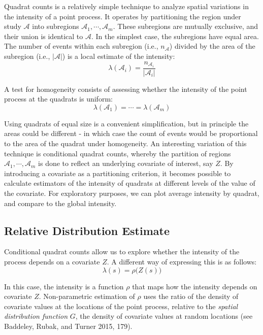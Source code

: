 \documentclass[smallextended]{svjour3}       %
\begin{document}
Quadrat counts is a relatively simple technique to analyze spatial
variations in the intensity of a point process. It operates by
partitioning the region under study \(\mathcal{A}\) into subregions
\(\mathcal{A}_1,\cdots,\mathcal{A}_m\). These subregions are mutually
exclusive, and their union is identical to \(\mathcal{A}\). In the
simplest case, the subregions have equal area. The number of events
within each subregion (i.e., \(n_{\mathcal{A}}\)) divided by the area of
the subregion (i.e., \(|\mathcal{A}|\)) is a local estimate of the
intensity: \[
\lambda(\mathcal{A}_i)=\frac{n_{\mathcal{A}_i}}{|\mathcal{A}_i|}
\]

A test for homogeneity consists of assessing whether the intensity of
the point process at the quadrats is uniform: \[
\lambda(\mathcal{A}_1)=\cdots=\lambda(\mathcal{A}_m)
\]

Using quadrats of equal size is a convenient simplification, but in
principle the areas could be different - in which case the count of
events would be proportional to the area of the quadrat under
homogeneity. An interesting variation of this technique is conditional
quadrat counts, whereby the partition of regions
\(\mathcal{A}_1,\cdots,\mathcal{A}_m\) is done to reflect an underlying
covariate of interest, say \(Z\). By introducing a covariate as a
partitioning criterion, it becomes possible to calculate estimators of
the intensity of quadrats at different levels of the value of the
covariate. For exploratory purposes, we can plot average intensity by
quadrat, and compare to the global intensity.

\hypertarget{relative-distribution-estimate}{%
\subsection{Relative Distribution
Estimate}\label{relative-distribution-estimate}}

Conditional quadrat counts allow us to explore whether the intensity of
the process depends on a covariate \(Z\). A different way of expressing
this is as follows: \[
\lambda(s)=\rho\big(Z(s)\big)
\]

In this case, the intensity is a function \(\rho\) that maps how the
intensity depends on covariate \(Z\). Non-parametric estimation of
\(\rho\) uses the ratio of the density of covariate values at the
locations of the point process, relative to the \emph{spatial
distribution function} \(G\), the density of covariate values at random
locations (see Baddeley, Rubak, and Turner 2015, 179).
\end{document}
